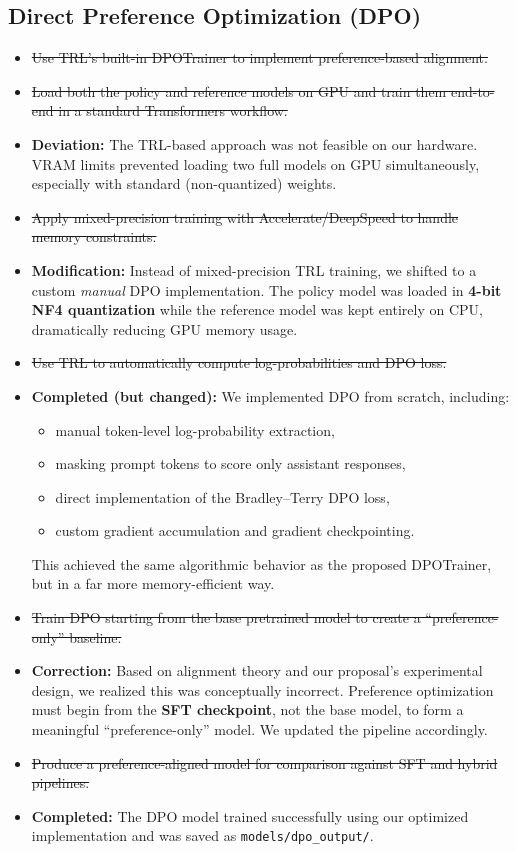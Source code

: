 \documentclass[11pt,a4paper]{article}
\begin{document}
\subsection{Direct Preference Optimization (DPO)}

\begin{itemize}
    \item \sout{Use TRL's built-in DPOTrainer to implement preference-based alignment.}
    \item \sout{Load both the policy and reference models on GPU and train them end-to-end in a standard Transformers workflow.}
    \item \textbf{Deviation:} The TRL-based approach was not feasible on our hardware. VRAM limits prevented loading two full models on GPU simultaneously, especially with standard (non-quantized) weights.
    
    \item \sout{Apply mixed-precision training with Accelerate/DeepSpeed to handle memory constraints.}
    \item \textbf{Modification:} Instead of mixed-precision TRL training, we shifted to a custom \emph{manual} DPO implementation. The policy model was loaded in \textbf{4-bit NF4 quantization} while the reference model was kept entirely on CPU, dramatically reducing GPU memory usage.

    \item \sout{Use TRL to automatically compute log-probabilities and DPO loss.}
    \item \textbf{Completed (but changed):} We implemented DPO from scratch, including:
    \begin{itemize}
        \item manual token-level log-probability extraction,
        \item masking prompt tokens to score only assistant responses,
        \item direct implementation of the Bradley--Terry DPO loss,
        \item custom gradient accumulation and gradient checkpointing.
    \end{itemize}
    This achieved the same algorithmic behavior as the proposed DPOTrainer, but in a far more memory-efficient way.

    \item \sout{Train DPO starting from the base pretrained model to create a ``preference-only'' baseline.}
    \item \textbf{Correction:} Based on alignment theory and our proposal's experimental design, we realized this was conceptually incorrect. Preference optimization must begin from the \textbf{SFT checkpoint}, not the base model, to form a meaningful ``preference-only'' model. We updated the pipeline accordingly.

    \item \sout{Produce a preference-aligned model for comparison against SFT and hybrid pipelines.}
    \item \textbf{Completed:} The DPO model trained successfully using our optimized implementation and was saved as \texttt{models/dpo\_output/}.
\end{itemize}
\end{document}
